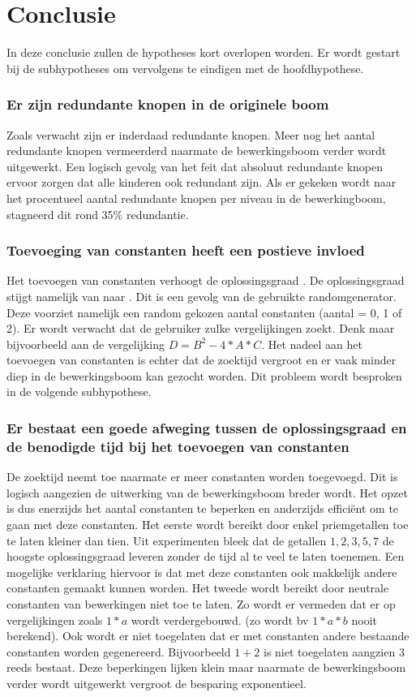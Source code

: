 \documentclass[Main.tex]{subfiles}
\begin{document}
\section{Conclusie}
In deze conclusie zullen de hypotheses kort overlopen worden. Er wordt gestart bij de subhypotheses om vervolgens te eindigen met de hoofdhypothese.
\subsubsection{Er zijn redundante knopen in de originele boom}
Zoals verwacht zijn er inderdaad redundante knopen. Meer nog het aantal redundante knopen vermeerderd naarmate de bewerkingsboom verder wordt uitgewerkt. Een logisch gevolg van het feit dat absoluut redundante knopen ervoor zorgen dat alle kinderen ook redundant zijn. Als er gekeken wordt naar het procentueel aantal redundante knopen per niveau in de bewerkingboom, stagneerd dit rond 35\% redundantie.
\subsubsection{Toevoeging van constanten heeft een postieve invloed}
Het toevoegen van constanten verhoogt de oplossingsgraad %
. De oplossingsgraad stijgt namelijk van %
naar %
. Dit is een gevolg van de gebruikte randomgenerator. Deze voorziet namelijk een random gekozen aantal constanten (aantal = 0, 1 of 2). Er wordt verwacht dat de gebruiker zulke vergelijkingen zoekt. Denk maar bijvoorbeeld aan de vergelijking $D = B^{2} - 4 \ast A \ast C$. Het nadeel aan het toevoegen van constanten is echter dat de zoektijd vergroot en er vaak minder diep in de bewerkingsboom kan gezocht worden. Dit probleem wordt besproken in de volgende subhypothese.
\subsubsection{Er bestaat een goede afweging tussen de oplossingsgraad en de benodigde tijd bij het toevoegen van constanten}
De zoektijd neemt toe naarmate er meer constanten worden toegevoegd. Dit is logisch aangezien de uitwerking van de bewerkingsboom breder wordt. Het opzet is dus enerzijds het aantal constanten te beperken en anderzijds effici\"ent om te gaan met deze constanten. Het eerste wordt bereikt door enkel priemgetallen toe te laten kleiner dan tien. Uit experimenten bleek dat de getallen $1, 2, 3, 5, 7$ de hoogste oplossingsgraad leveren zonder de tijd al te veel te laten toenemen. Een mogelijke verklaring hiervoor is dat met deze constanten ook makkelijk andere constanten gemaakt kunnen worden. Het tweede wordt bereikt door neutrale constanten van bewerkingen niet toe te laten. Zo wordt er vermeden dat er op vergelijkingen zoals $1*a$ wordt verdergebouwd. (zo wordt bv $1*a*b$ nooit berekend). Ook wordt er niet toegelaten dat er met constanten andere bestaande constanten worden gegenereerd. Bijvoorbeeld $1+2$ is niet toegelaten aangzien $3$ reeds bestaat. Deze beperkingen lijken klein maar naarmate de bewerkingsboom verder wordt uitgewerkt vergroot de besparing exponentieel. %
\end{document}
